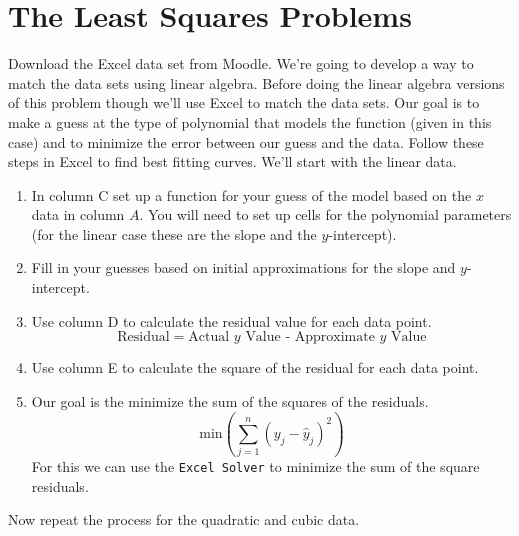 \section{The Least Squares Problems}
\begin{problem}
    Download the Excel data set from Moodle.  We're going to develop a way to match the
    data sets using linear algebra.  Before doing the linear algebra versions of this
    problem though we'll use Excel to match the data sets.  Our goal is to make a guess at
    the type of polynomial that models the function (given in this case) and to minimize
    the error between our guess and the data.  Follow these steps in Excel to find best
    fitting curves.  We'll start with the linear data.
    \begin{enumerate}
        \item In column C set up a function for your guess of the model based on the $x$ data in column
            $A$.  You will need to set up cells for the polynomial parameters (for the
            linear case these are the slope and the $y$-intercept).
        \item Fill in your guesses based on initial approximations for the slope and
            $y$-intercept.
        \item Use column D to calculate the residual value for each data point.
            \[ \text{Residual} = \text{Actual $y$ Value - Approximate $y$ Value} \]
        \item Use column E to calculate the square of the residual for each data point.
        \item Our goal is the minimize the sum of the squares of the residuals.
            \[ \text{min} \left( \sum_{j=1}^n \left( y_j - \hat{y}_j \right)^2 \right) \]
            For this we can use the \texttt{Excel Solver} to minimize the sum of the
            square residuals.
    \end{enumerate}
    Now repeat the process for the quadratic and cubic data.
\end{problem}



